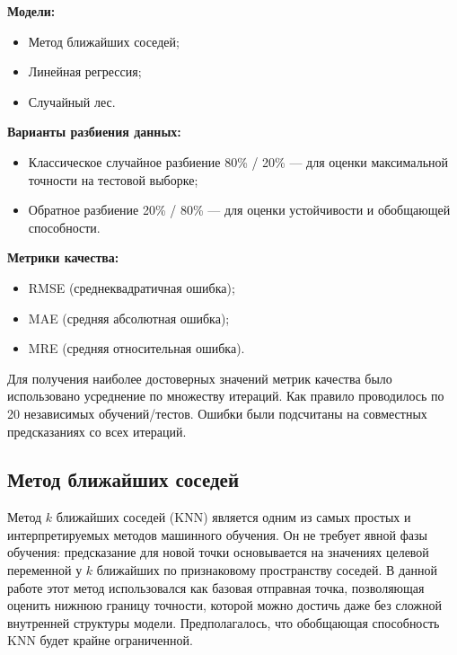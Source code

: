\documentclass[a4paper,12pt]{article}
\begin{document}
  \begin{minipage}{\textwidth}
    \textbf{Модели:}
    \begin{itemize}
      \item Метод ближайших соседей;
      \item Линейная регрессия;
      \item Случайный лес.
    \end{itemize}
  \end{minipage}
  
  \begin{minipage}{\textwidth}
    \textbf{Варианты разбиения данных:}
    \begin{itemize}
      \item Классическое случайное разбиение 80\% / 20\% — для оценки максимальной точности на тестовой выборке;
      \item Обратное разбиение 20\% / 80\% — для оценки устойчивости и обобщающей способности.
    \end{itemize}
  \end{minipage}
  
  \begin{minipage}{\textwidth}
    \textbf{Метрики качества:}
    \begin{itemize}
      \item RMSE (среднеквадратичная ошибка);
      \item MAE (средняя абсолютная ошибка);
      \item MRE (средняя относительная ошибка).
    \end{itemize}
  \end{minipage}

  Для получения наиболее достоверных значений метрик качества было использовано усреднение по множеству итераций. Как правило проводилось по 20 независимых обучений/тестов. Ошибки были подсчитаны на совместных предсказаниях со всех итераций.

  \subsection{Метод ближайших соседей}

    Метод \(k\) ближайших соседей (KNN) является одним из самых простых и интерпретируемых методов машинного обучения. Он не требует явной фазы обучения: предсказание для новой точки основывается на значениях целевой переменной у \(k\) ближайших по признаковому пространству соседей. В данной работе этот метод использовался как базовая отправная точка, позволяющая оценить нижнюю границу точности, которой можно достичь даже без сложной внутренней структуры модели. Предполагалось, что обобщающая способность KNN будет крайне ограниченной.
\end{document}

